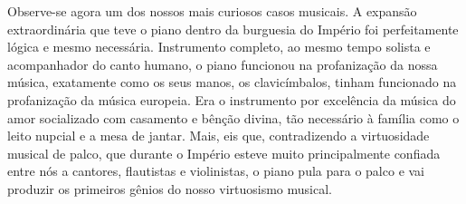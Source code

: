 Observe-se agora um dos nossos mais curiosos casos musicais. A expansão
extraordinária que teve o piano dentro da burguesia do Império foi
perfeitamente lógica e mesmo necessária. Instrumento completo, ao mesmo
tempo solista e acompanhador do canto humano, o piano funcionou na
profanização da nossa música, exatamente como os seus manos, os
clavicímbalos, tinham funcionado na profanização da música europeia. Era
o instrumento por excelência da música do amor socializado com casamento
e bênção divina, tão necessário à família como o leito nupcial e a mesa
de jantar. Mais, eis que, contradizendo a virtuosidade musical de palco,
que durante o Império esteve muito principalmente confiada entre nós a
cantores, flautistas e violinistas, o piano pula para o palco e vai
produzir os primeiros gênios do nosso virtuosismo musical.


